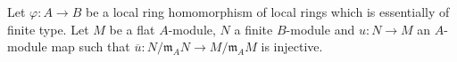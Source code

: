\begin{situation}
\label{situation-mod-injective}
Let $\varphi : A \to B$ be a local ring homomorphism of local rings
which is essentially of finite type. Let $M$ be a flat $A$-module,
$N$ a finite $B$-module and $u : N \to M$ an $A$-module map such that
$\overline{u} : N/\mathfrak m_AN \to M/\mathfrak m_AM$ is injective.
\end{situation}
